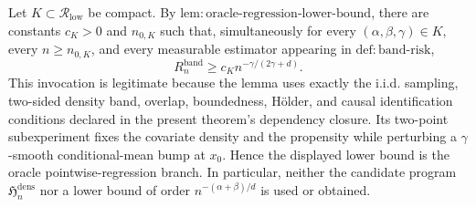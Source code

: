 Let \(K\subset\mathcal R_{\mathrm{low}}\) be compact.  By
\(\mathrm{lem:oracle\mbox{-}regression\mbox{-}lower\mbox{-}bound}\), there are
constants \(c_K>0\) and \(n_{0,K}\) such that, simultaneously for every
\((\alpha,\beta,\gamma)\in K\), every \(n\geq n_{0,K}\), and every measurable
estimator appearing in \(\mathrm{def:band\mbox{-}risk}\),
\[
R_n^{\mathrm{band}}
\geq c_K n^{-\gamma/(2\gamma+d)}.
\]
This invocation is legitimate because the lemma uses exactly the i.i.d. sampling,
two-sided density band, overlap, boundedness, H\"older, and causal identification
conditions declared in the present theorem's dependency closure.  Its two-point
subexperiment fixes the covariate density and the propensity while perturbing a
\(\gamma\)-smooth conditional-mean bump at \(x_0\).  Hence the displayed lower
bound is the oracle pointwise-regression branch.  In particular, neither the
candidate program \(\mathfrak H_n^{\mathrm{dens}}\) nor a lower bound of order
\(n^{-(\alpha+\beta)/d}\) is used or obtained.